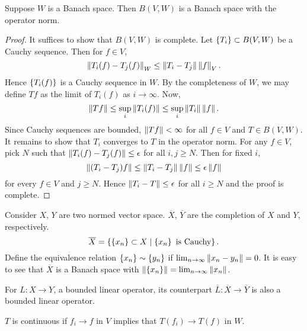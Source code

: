 \begin{proposition}
    Suppose $W$ is a Banach space. Then $B(V,W)$ is a Banach 
    space with the operator norm.
\end{proposition}
\begin{proof}
    It suffices to show that $B(V,W)$ is complete. Let 
    $\left\{ {T_i} \right\}\subset B(V,W)$ be a Cauchy sequence. Then for 
    $f\in V$, 
    \begin{equation*}
        \left\lVert {T_i(f)-T_j(f)} \right\rVert_W \leq \left\lVert {T_i-T_j} \right\rVert\left\lVert {f} \right\rVert_V.
    \end{equation*} 
    Hence $\left\{ {T_i(f)} \right\}$ is a Cauchy sequence in $W$. By the 
    completeness of $W$, we may define $Tf$ as the limit of 
    $T_i(f)$ as $i\to\infty$. Now, 
    \begin{equation*}
        \left\lVert {Tf} \right\rVert \leq \sup_i\left\lVert {T_i(f)} \right\rVert \leq \sup_i \left\lVert {T_i} \right\rVert\left\lVert {f} \right\rVert.
    \end{equation*}
    Since Cauchy sequences are bounded, $\left\lVert {Tf} \right\rVert < \infty$ for 
    all $f\in V$ and $T\in B(V,W)$. It remains to show that 
    $T_i$ converges to $T$ in the operator norm. For any $f\in V$, 
    pick $N$ such that $\left\lVert {T_i(f)-T_j(f)} \right\rVert\leq\epsilon$ for all 
    $i,j\geq N$. Then for fixed $i$, 
    \begin{equation*}
        \left\lVert {(T_i-T_j)f} \right\rVert \leq \left\lVert {T_i-T_j} \right\rVert\left\lVert {f} \right\rVert \leq \epsilon\left\lVert {f} \right\rVert 
    \end{equation*}
    for every $f\in V$ and $j\geq N$. Hence $\left\lVert {T_i - T} \right\rVert\leq\epsilon$ 
    for all $i\geq N$ and the proof is complete.
\end{proof} 
\begin{remark}
    Consider $X$, $Y$ are two normed vector space. $\overline{X}$, 
    $\overline{Y}$ are the completion of $X$ and $Y$, respectively. 
    \begin{equation*}
        \overline{X} = \left\{ \left\{ {x_n} \right\}\subset X \;\middle\vert\; \left\{ {x_n} \right\} \text{ is Cauchy} \right\}.
    \end{equation*}
    Define the equivalence relation $\left\{ {x_n} \right\}\sim\left\{ {y_n} \right\}$ if 
    $\lim_{n\to\infty}\left\lVert {x_n-y_n} \right\rVert = 0$. It is easy to see 
    that $\overline{X}$ is a Banach space with $\left\lVert {\left\{ {x_n} \right\}} \right\rVert = \lim_{n\to\infty}\left\lVert {x_n} \right\rVert$.

    For $L:X\to Y$, a bounded linear operator, its counterpart 
    $\overline{L}:\overline{X}\to\overline{Y}$ is also a bounded 
    linear operator. 
\end{remark}


\begin{definition}
    $T$ is continuous if $f_i\to f$ in $V$ implies that 
    $T(f_i)\to T(f)$ in $W$.
\end{definition} 

